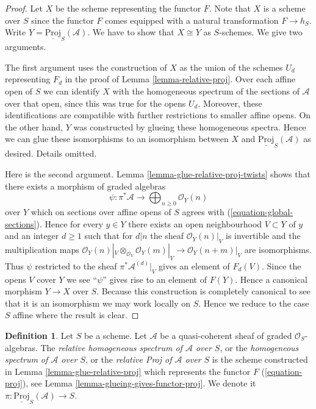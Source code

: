 \documentclass{stacks-project}
\theoremstyle{plain}
\theoremstyle{definition}
\newtheorem{definition}[subsection]{Definition}
\theoremstyle{remark}
\numberwithin{equation}{subsection}
\begin{document}
\begin{proof}
Let $X$ be the scheme representing the functor $F$.
Note that $X$ is a scheme over $S$ since the functor $F$
comes equipped with a natural transformation $F \to h_S$.
Write $Y = \underline{\text{Proj}}_S(\mathcal{A})$.
We have to show that $X \cong Y$ as $S$-schemes.
We give two arguments.

\medskip\noindent
The first argument uses the construction of $X$ as the union
of the schemes $U_d$ representing $F_d$ in the
proof of Lemma \ref{lemma-relative-proj}.
Over each affine open of $S$ we can identify $X$ with the homogeneous spectrum
of the sections of $\mathcal{A}$ over that open, since this was
true for the opens $U_d$. Moreover, these identifications
are compatible with further restrictions to smaller affine opens.
On the other hand, $Y$ was constructed by glueing these
homogeneous spectra.
Hence we can glue these isomorphisms to an isomorphism
between $X$ and $\underline{\text{Proj}}_S(\mathcal{A})$ as
desired. Details omitted.

\medskip\noindent
Here is the second argument.
Lemma \ref{lemma-glue-relative-proj-twists}
shows that there exists a morphism of graded algebras
$$
\psi : \pi^*\mathcal{A}
\longrightarrow
\bigoplus\nolimits_{n \geq 0} \mathcal{O}_Y(n)
$$
over $Y$ which on sections over affine opens of $S$ agrees with
(\ref{equation-global-sections}). Hence for every $y \in Y$
there exists an open neighbourhood $V \subset Y$ of $y$
and an integer $d \geq 1$ such that for $d | n$ the sheaf
$\mathcal{O}_Y(n)|_V$ is invertible and the multiplication maps
$\mathcal{O}_Y(n)|_V \otimes_{\mathcal{O}_V} \mathcal{O}_Y(m)|_V
\to \mathcal{O}_Y(n + m)|_V$ are isomorphisms. Thus
$\psi$ restricted to the sheaf $\pi^*\mathcal{A}^{(d)}|_V$
gives an element of $F_d(V)$. Since the opens $V$ cover $Y$
we see ``$\psi$'' gives rise to an element of $F(Y)$.
Hence a canonical morphism $Y \to X$ over $S$.
Because this construction is completely canonical to see
that it is an isomorphism we may work locally on $S$.
Hence we reduce to the case $S$ affine where the result is clear.
\end{proof}

\begin{definition}
\label{definition-relative-proj}
Let $S$ be a scheme. Let $\mathcal{A}$ be a quasi-coherent sheaf of
graded $\mathcal{O}_S$-algebras. The
{\it relative homogeneous spectrum of $\mathcal{A}$ over $S$},
or the {\it homogeneous spectrum of $\mathcal{A}$ over $S$}, or the
{\it relative Proj of $\mathcal{A}$ over $S$} is the scheme
constructed in Lemma \ref{lemma-glue-relative-proj} which represents the
functor $F$ (\ref{equation-proj}), see
Lemma \ref{lemma-glueing-gives-functor-proj}.
We denote it $\pi : \underline{\text{Proj}}_S(\mathcal{A}) \to S$.
\end{definition}
\end{document}

